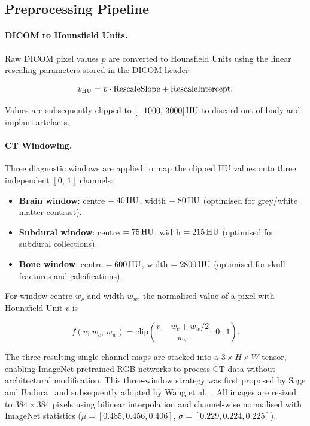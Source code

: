 \subsection{Preprocessing Pipeline}
\label{sec:preprocessing}

\paragraph{DICOM to Hounsfield Units.}
Raw DICOM pixel values $p$ are converted to Hounsfield Units using the
linear rescaling parameters stored in the DICOM header:

\begin{equation}
    v_{\mathrm{HU}} = p \cdot \mathrm{RescaleSlope} + \mathrm{RescaleIntercept}.
    \label{eq:hu_conversion}
\end{equation}

Values are subsequently clipped to $[-1000,\, 3000]\,\mathrm{HU}$ to discard
out-of-body and implant artefacts.

\paragraph{CT Windowing.}
Three diagnostic windows are applied to map the clipped HU values onto
three independent $[0,\,1]$ channels:

\begin{itemize}
    \item \textbf{Brain window}: centre $= 40\,\mathrm{HU}$, width $= 80\,\mathrm{HU}$
          (optimised for grey/white matter contrast).
    \item \textbf{Subdural window}: centre $= 75\,\mathrm{HU}$, width $= 215\,\mathrm{HU}$
          (optimised for subdural collections).
    \item \textbf{Bone window}: centre $= 600\,\mathrm{HU}$, width $= 2800\,\mathrm{HU}$
          (optimised for skull fractures and calcifications).
\end{itemize}

For window centre $w_c$ and width $w_w$, the normalised value of a
pixel with Hounsfield Unit $v$ is

\begin{equation}
    f(v;\,w_c,\,w_w) =
        \mathrm{clip}\!\left(\frac{v - w_c + w_w/2}{w_w},\;0,\;1\right).
    \label{eq:windowing}
\end{equation}

The three resulting single-channel maps are stacked into a
$3 \times H \times W$ tensor, enabling ImageNet-pretrained RGB networks
to process CT data without architectural modification.
This three-window strategy was first proposed by
Sage and Badura~\cite{sage2020doublebranch} and subsequently adopted
by Wang et al.~\cite{wang2021deeplearning}.
All images are resized to $384 \times 384$ pixels using bilinear
interpolation and channel-wise normalised with ImageNet statistics
($\mu = [0.485, 0.456, 0.406]$,
$\sigma = [0.229, 0.224, 0.225]$).

